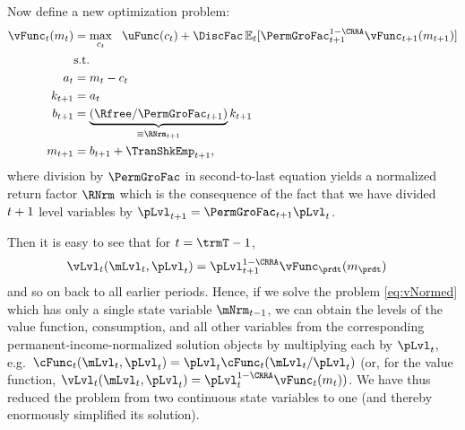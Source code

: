 Now define a new optimization problem:
  \begin{equation}\begin{gathered}\begin{aligned}
        \vFunc_{\prd}(m_{\prd}) & = \max_{{c}_{\prd}} ~~ \uFunc(c_{\prd})+{\DiscFac}\Ex_{\prd}[ \PermGroFac_{\prd+1}^{1-\CRRA}\vFunc_{\prd+1}(m_{\prd+1})] \label{eq:vNormed}                   \\
                                         & \text{s.t.}                                                                                 \\
        a_{\prd}                       & = m_{\prd}-c_{\prd}                                                                     \\
        k_{\prd+1}                     & = a_{\prd}                                                                                \\
        b_{\prd+1}                     & = \underbrace{\left(\Rfree/\PermGroFac_{\prd+1}\right)}_{\equiv \RNrm_{\prd+1}}k_{\prd+1} \\
        m_{t+1}                        & = b_{t+1}+\TranShkEmp_{t+1},
      \end{aligned}\end{gathered}\end{equation}
where division by $\PermGroFac$ in second-to-last equation yields a normalized return factor $\RNrm$ which is the consequence of the fact that we have divided $t+1$ level variables by $\pLvl_{\prd+1}=\PermGroFac_{\prd+1}\pLvl_{\prd}$.

Then it is easy to see that for $\prd=\trmT-1$, 
\begin{equation*}\begin{gathered}\begin{aligned}
      \vLvl_{\prd}(\mLvl_{\prd},\pLvl_{\prd}) & =  \pLvl_{\prd+1}^{1-\CRRA}\vFunc_{\prdt}(m_{\prdt})
    \end{aligned}\end{gathered}\end{equation*}
and so on back to all earlier periods.  Hence, if we solve the problem \eqref{eq:vNormed} which has only a single state variable $\mNrm_{\prd-1}$, we can obtain the levels of the value function, consumption, and all other variables from the corresponding permanent-income-normalized solution objects by multiplying each by $\pLvl_{\prd}$, e.g.\ $\cFunc_{\prd}(\mLvl_{\prd},\pLvl_{\prd})=\pLvl_{\prd}\cFunc_{\prd}(\mLvl_{\prd}/\pLvl_{\prd})$ (or, for the value function, $\vLvl _{\prd}(\mLvl_{\prd},\pLvl_{\prd}) = \pLvl_{\prd}^{1-\CRRA}\vFunc_{\prd}(m_{\prd}))$.  We have thus reduced the problem from two continuous state variables to one (and thereby enormously simplified its solution).

